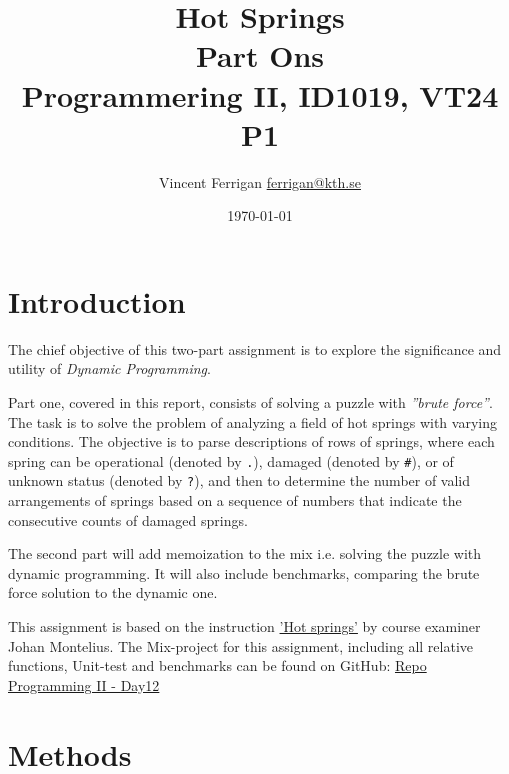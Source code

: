 \documentclass[a4paper,11pt]{article}
\begin{document}
\title{
    Hot Springs
    \\Part Ons
\\\small{Programmering II, ID1019, VT24 P1}
}
\author{Vincent Ferrigan \href{mailto:ferrigan@kth.se}{ferrigan@kth.se}}

\date{\today}

\maketitle

\section*{Introduction}
\label{sec:introduction}
The chief objective of this two-part assignment is to explore the significance
and utility of \emph{Dynamic Programming}.

Part one, covered in this report, consists of solving a puzzle with
\emph{''brute force''}.
The task is to solve the problem of analyzing a field of
hot springs with varying conditions.
The objective is to parse descriptions of rows of springs,
where each spring can be operational (denoted by \verb|.|),
damaged (denoted by \verb|#|), or of unknown status (denoted by \verb|?|),
and then to determine the number of valid arrangements of springs
based on a sequence of numbers that indicate the consecutive counts of damaged springs.

The second part will add memoization to the mix i.e.
solving the puzzle with dynamic programming.
It will also include benchmarks, comparing the brute force solution to the dynamic one.


This assignment is based on the instruction
\href{https://people.kth.se/~johanmon/courses/id1019/seminars/springs/springs.pdf}{'Hot springs'}
by course examiner Johan Montelius.
The Mix-project for this assignment, including all relative functions, Unit-test and benchmarks can be found on GitHub:
\href{https://github.com/VincentFerrigan/kth-id1019-programming-ii/tree/main/tasks/5/day12}{Repo Programming II - Day12}%

\section*{Methods}
\label{sec:methods}
\end{document}
